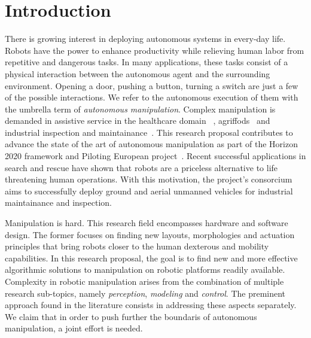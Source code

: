 \section{Introduction}
\label{sec:Introduction}



There is growing interest in deploying autonomous systems in every-day life. Robots have the power to enhance productivity while relieving human labor from repetitive and dangerous tasks. In many applications, these tasks consist of a physical interaction between the autonomous agent and the surrounding environment. Opening a door, pushing a button, turning a switch are just a few of the possible interactions. We refer to the autonomous execution of them with the umbrella term of \emph{autonomous manipulation}. Complex manipulation is demanded in assistive service in the healthcare domain~\cite{cooper2020ari} , agriffods~\cite{duckett2018agricultural} and industrial inspection and maintainance~\cite{lattanzi2017review}. This research proposal contributes to advance the state of the art of autonomous manipulation as part of the Horizon 2020 framework and Piloting European project~\cite{eu-piloting-2020}. Recent successful applications in search and rescue have shown that robots are a priceless alternative to life threatening human operations. With this motivation, the project's consorcium aims to successfully deploy ground and aerial unmanned vehicles for industrial maintainance and inspection. 


Manipulation is hard. This research field encompasses hardware and software design. The former focuses on finding new layouts, morphologies and actuation principles that bring robots closer to the human dexterous and mobility capabilities. In this research proposal, the goal is to find new and more effective algorithmic solutions to manipulation on robotic platforms readily available. Complexity in robotic manipulation arises from the combination of multiple research sub-topics, namely \emph{perception}, \emph{modeling} and \emph{control}. The preminent approach found in the literature consists in addressing these aspects separately. We claim that in order to push further the boundaris of autonomous manipulation, a joint effort is needed. 

